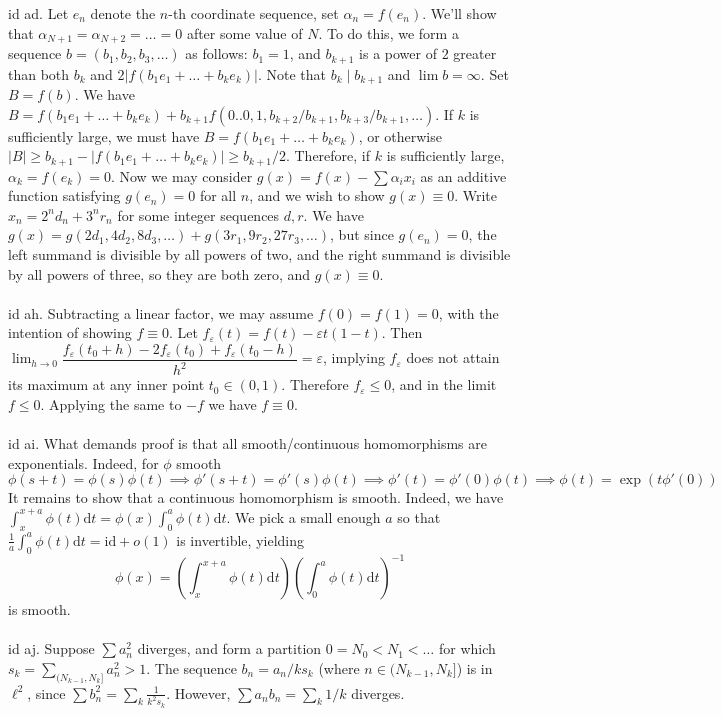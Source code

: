 \documentclass[oneside]{book}
\newcommand{\eps}{\varepsilon}
\newcommand{\fit}[1]{\left( #1\right)}
\newcommand{\inv}{^{-1}}
\newcommand{\abs}[1]{\left\lvert #1\right\rvert}
\renewcommand{\d}{\mathrm{d}}
\newcommand{\dt}{\mathrm{d}t}
\newcommand{\id}{\mathrm{id}}
\begin{document}
id ad. Let $e_n$ denote the $n$-th coordinate sequence, set $\alpha_n=f(e_n)$. We'll show that $\alpha_{N+1}=\alpha_{N+2}=\dots = 0$ after some value of $N$. To do this, we form a sequence $b=(b_1,b_2,b_3,\dots)$ as follows: $b_1=1$, and $b_{k+1}$ is a power of $2$ greater than both $b_k$ and $2\abs{f(b_1e_1+\dots+b_ke_k)}$. Note that $b_k\mid b_{k+1}$ and $\lim b=\infty$. Set $B=f(b)$. We have $B=f(b_1e_1+\dots+b_ke_k)+b_{k+1}f\fit{0..0,1,{b_{k+2}}/{b_{k+1}},{b_{k+3}}/{b_{k+1}},\dots}$. If $k$ is sufficiently large, we must have $B=f(b_1e_1+\dots+b_ke_k)$, or otherwise $|B|\ge b_{k+1} - \abs{f(b_1e_1+\dots+b_ke_k)}\ge b_{k+1}/2$. Therefore, if $k$ is sufficiently large, $\alpha_k=f(e_k)=0$. Now we may consider $g(x)=f(x)-\sum \alpha_i x_i$ as an additive function satisfying $g(e_n)=0$ for all $n$, and we wish to show $g(x)\equiv 0$. Write $x_n = 2^n d_n + 3^n r_n$ for some integer sequences $d,r$. We have $g(x)=g(2d_1,4d_2,8d_3,\dots)+g(3r_1,9r_2,27r_3,\dots)$, but since $g(e_n)=0$, the left summand is divisible by all powers of two, and the right summand is divisible by all powers of three, so they are both zero, and $g(x)\equiv0$. \\\\


id ah. Subtracting a linear factor, we may assume $f(0)=f(1)=0$, with the intention of showing $f\equiv 0$. Let $f_\eps(t)=f(t)-\eps t(1-t)$. Then $\displaystyle\lim_{h\to 0}\dfrac{f_\eps(t_0+h)-2f_\eps(t_0)+f_\eps(t_0-h)}{h^2}=\eps$, implying $f_\eps$ does not attain its maximum at any inner point $t_0\in(0,1)$. Therefore $f_\eps\le 0$, and in the limit $f\le 0$. Applying the same to $-f$ we have $f\equiv 0$.   \\\\


id ai. What demands proof is that all smooth/continuous homomorphisms are exponentials. Indeed, for $\phi$ smooth $$\phi(s+t)=\phi(s)\phi(t)\implies \phi'(s+t)=\phi'(s)\phi(t)\implies \phi'(t)=\phi'(0)\phi(t)\implies\phi(t)=\exp(t\phi'(0))$$
It remains to show that a continuous homomorphism is smooth. Indeed, we have $\int_x^{x+a}\phi(t)\d t=\phi(x)\int_0^a\phi(t)\d t$. We pick a small enough $a$ so that $\frac{1}{a}\int_0^a\phi(t)\d t=\id + o(1)$ is invertible, yielding
$$\phi(x)=\fit{\int_x^{x+a}\phi(t)\dt}\fit{\int_0^a\phi(t)\dt}\inv$$
is smooth.  \\\\


id aj. Suppose $\sum a_n^2$ diverges, and form a partition $0=N_0<N_1<\dots$ for which $s_k=\sum_{(N_{k-1},N_k]}a_n^2 > 1$. The sequence $b_n=a_n/ks_k$ (where $n\in (N_{k-1},N_k]$) is in $\ell^2$, since $\sum b_n^2=\sum_k \frac{1}{k^2s_k}$. However, $\sum a_nb_n=\sum_k 1/k$ diverges.    \\\\
\end{document}
